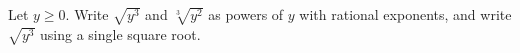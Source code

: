Let $y\ge0$. Write $\sqrt{y^3}$ and $\sqrt[3]{y^2}$ as powers of $y$ with rational exponents, and write $\sqrt{y^3}$ using a single square root.
